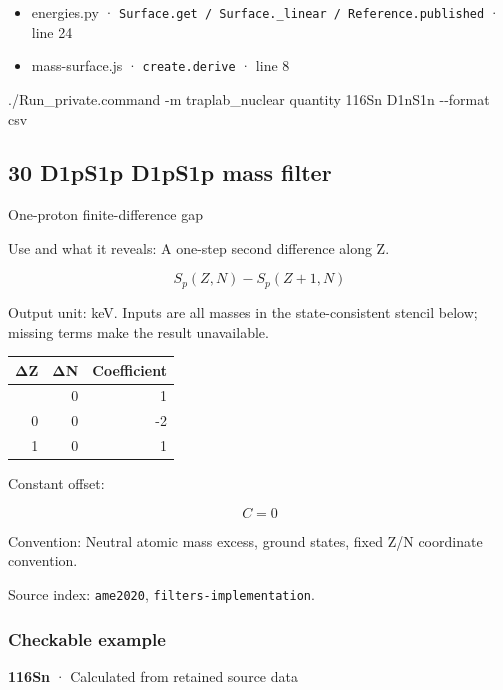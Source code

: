 \documentclass[
  11pt,
  letterpaper,
]{article}
\newenvironment{Shaded}{}{}
\newcommand{\AttributeTok}[1]{\textcolor[rgb]{0.49,0.56,0.16}{#1}}
\newcommand{\ExtensionTok}[1]{#1}
\newcommand{\NormalTok}[1]{#1}
\providecommand{\tightlist}{%
  \setlength{\itemsep}{0pt}\setlength{\parskip}{0pt}}
\begin{document}
\begin{itemize}
\tightlist
\item
  energies.py ·
  \texttt{Surface.get\ /\ Surface.\_linear\ /\ Reference.published} ·
  line 24
\item
  mass-surface.js · \texttt{create.derive} · line 8
\end{itemize}

\begin{Shaded}
\begin{Highlighting}[]
\ExtensionTok{./Run\_private.command} \AttributeTok{{-}m}\NormalTok{ traplab\_nuclear quantity 116Sn D1nS1n }\AttributeTok{{-}{-}format}\NormalTok{ csv}
\end{Highlighting}
\end{Shaded}

\subsection{30 D1pS1p D1pS1p mass
filter}\label{d1ps1p-d1ps1p-mass-filter}

One-proton finite-difference gap

Use and what it reveals: A one-step second difference along Z.

\[
S_p(Z,N)-S_p(Z+1,N)
\]

Output unit: keV. Inputs are all masses in the state-consistent stencil
below; missing terms make the result unavailable.

\begin{longtable}[]{@{}rrr@{}}
\toprule\noalign{}
ΔZ & ΔN & Coefficient \\
\midrule\noalign{}
\endhead
\bottomrule\noalign{}
\endlastfoot
-1 & 0 & 1 \\
0 & 0 & -2 \\
1 & 0 & 1 \\
\end{longtable}

Constant offset:

\[
C=0
\]

Convention: Neutral atomic mass excess, ground states, fixed Z/N
coordinate convention.

Source index: \texttt{ame2020}, \texttt{filters-implementation}.

\subsubsection{Checkable example}\label{checkable-example-29}

\textbf{116Sn} · Calculated from retained source data
\end{document}
